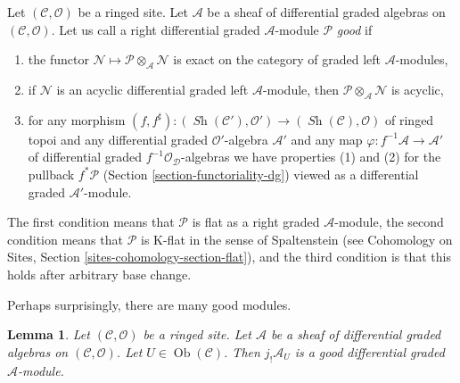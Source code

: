 \documentclass{stacks-project}
\theoremstyle{plain}
\newtheorem{lemma}[subsection]{Lemma}
\theoremstyle{definition}
\theoremstyle{remark}
\numberwithin{equation}{subsection}
\def\Ob{\mathop{\mathrm{Ob}}\nolimits}
\def\Sh{\mathop{\mathit{Sh}}\nolimits}
\begin{document}
\medskip\noindent
Let $(\mathcal{C}, \mathcal{O})$ be a ringed site.
Let $\mathcal{A}$ be a sheaf of differential graded algebras
on $(\mathcal{C}, \mathcal{O})$. Let us call a right differential
graded $\mathcal{A}$-module $\mathcal{P}$ {\it good}
if
\begin{enumerate}
\item the functor
$\mathcal{N} \mapsto \mathcal{P} \otimes_\mathcal{A} \mathcal{N}$
is exact on the category of graded left $\mathcal{A}$-modules,
\item if $\mathcal{N}$ is an acyclic differential graded left
$\mathcal{A}$-module, then
$\mathcal{P} \otimes_\mathcal{A} \mathcal{N}$ is acyclic,
\item for any morphism $(f, f^\sharp) : (\Sh(\mathcal{C}'), \mathcal{O}')
\to (\Sh(\mathcal{C}), \mathcal{O})$
of ringed topoi and any differential graded $\mathcal{O}'$-algebra
$\mathcal{A}'$ and any map $\varphi : f^{-1}\mathcal{A} \to \mathcal{A}'$
of differential graded $f^{-1}\mathcal{O}_\mathcal{D}$-algebras we have
properties (1) and (2) for the pullback $f^*\mathcal{P}$
(Section \ref{section-functoriality-dg})
viewed as a differential graded $\mathcal{A}'$-module.
\end{enumerate}
The first condition means that $\mathcal{P}$ is flat as a right graded
$\mathcal{A}$-module, the second condition means that $\mathcal{P}$ is
K-flat in the sense of Spaltenstein (see
Cohomology on Sites, Section \ref{sites-cohomology-section-flat}), and
the third condition is that this holds after arbitrary base change.

\medskip\noindent
Perhaps surprisingly, there are many good modules.

\begin{lemma}
\label{lemma-supply-good}
Let $(\mathcal{C}, \mathcal{O})$ be a ringed site.
Let $\mathcal{A}$ be a sheaf of differential graded algebras
on $(\mathcal{C}, \mathcal{O})$. Let $U \in \Ob(\mathcal{C})$.
Then $j_!\mathcal{A}_U$ is a good differential graded
$\mathcal{A}$-module.
\end{lemma}
\end{document}
